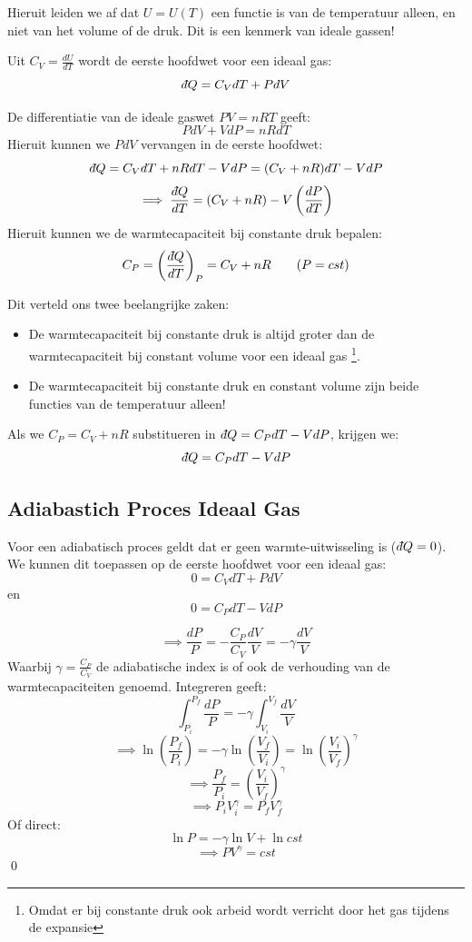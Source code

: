 Hieruit leiden we af dat \(U = U(T)\) een functie is van de temperatuur alleen, en niet van het volume of de druk. Dit is een kenmerk van ideale gassen!

Uit \(C_V = \frac{dU}{dT}\) wordt de eerste hoofdwet voor een ideaal gas:
\begin{equation}
    \label{eq:1e-HW-C_V}
    \dbar Q = C_V dT + PdV
\end{equation}

De differentiatie van de ideale gaswet \(PV = nRT\) geeft:
\[PdV + VdP = nRdT\]
Hieruit kunnen we \(PdV\) vervangen in de eerste hoofdwet:
\[\dbar Q = C_V dT + nRdT - VdP = (C_V + nR) dT - VdP\]
\[\implies \frac{\dbar Q}{dT} = (C_V + nR) - V \left( \frac{dP}{dT} \right)\]
Hieruit kunnen we de warmtecapaciteit bij constante druk bepalen:
\[C_P  = \left( \frac{\dbar Q}{dT} \right)_P = C_V + nR \qquad  (P = cst)\]

Dit verteld ons twee beelangrijke zaken:
\begin{itemize}
    \item De warmtecapaciteit bij constante druk is altijd groter dan de warmtecapaciteit bij constant volume voor een ideaal gas \footnote{Omdat er bij constante druk ook arbeid wordt verricht door het gas tijdens de expansie}.
    \item De warmtecapaciteit bij constante druk en constant volume zijn beide functies van de temperatuur alleen!
\end{itemize}

Als we \(C_P = C_V + nR\) substitueren in \(\dbar Q = C_P dT - VdP\), krijgen we:
\begin{equation}
    \label{eq:1eHW-C_P}
     \dbar Q = C_P dT - VdP
\end{equation}


\subsection{Adiabastich Proces Ideaal Gas}
\begin{derivation}
    
Voor een adiabatisch proces geldt dat er geen warmte-uitwisseling is (\(\dbar Q = 0\)). We kunnen dit toepassen op de eerste hoofdwet voor een ideaal gas:
\[0 = C_V dT + PdV\]
en
\[0 = C_P dT - VdP\]

\[\implies \frac{dP}{P} = -\frac{C_P}{C_V} \frac{dV}{V} = -\gamma \frac{dV}{V}\]
Waarbij \(\gamma = \frac{C_P}{C_V}\) de adiabatische index is of ook de verhouding van de warmtecapaciteiten genoemd.
Integreren geeft:
\[
\int_{P_i}^{P_f} \frac{dP}{P} = -\gamma \int_{V_i}^{V_f} \frac{dV}{V}
\]
\[\implies \ln \left( \frac{P_f}{P_i} \right) = -\gamma \ln \left( \frac{V_f}{V_i} \right)  = \ln \left( \frac{V_i}{V_f} \right)^\gamma\]
\[\implies \frac{P_f}{P_i} = \left( \frac{V_i}{V_f} \right)^\gamma\]
\[\implies P_i V_i^\gamma = P_f V_f^\gamma\]
Of direct:
\[\ln P = -\gamma \ln V + \ln cst\]
\[\implies  PV^{\gamma} = cst\]
\qed
\end{derivation}


